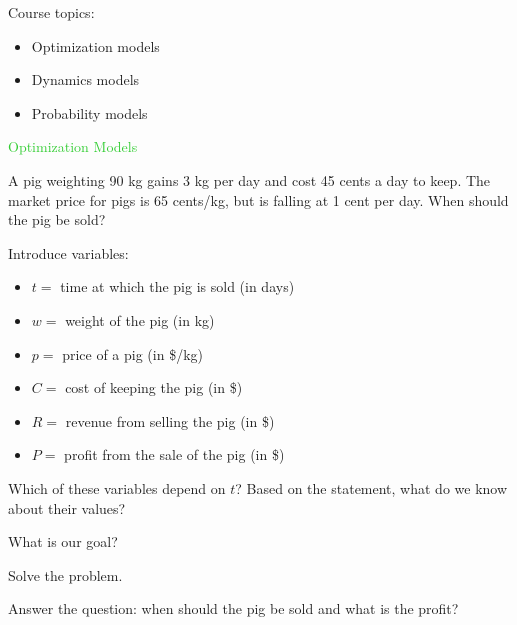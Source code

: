 \documentclass{workbook}
\begin{document}
\begin{slide}

Course topics:

\begin{itemize}
	\item Optimization models
	\item Dynamics models
	\item Probability models
\end{itemize}
	
\end{slide}




%
%
%
%




\begin{slide}

\vspace{3cm}

\begin{center}
\Huge 
\textcolor{LimeGreen}{Optimization Models}
\end{center}

	
\end{slide}




\begin{slide}

\question

\begin{problem}
A pig weighting 90 kg gains 3 kg per day and cost 45 cents a day to keep. The market price for pigs is 65 cents/kg, but is falling at 1 cent per day. When should the pig be sold?	
\end{problem}

Introduce variables:
\begin{itemize}
	\item $t=$ time at which the pig is sold (in days)
	\item $w=$ weight of the pig (in kg)
	\item $p=$ price of a pig (in \$/kg)
	\item $C=$ cost of keeping the pig (in \$)
	\item $R=$ revenue from selling the pig (in \$)
	\item $P=$ profit from the sale of the pig (in \$)
\end{itemize}
	

\begin{parts}
	\item Which of these variables depend on $t$? Based on the statement, what do we know about their values?
	\item What is our goal?
	\item Solve the problem.
	\item Answer the question: when should the pig be sold and what is the profit?
\end{parts}

\end{slide}
\end{document}
